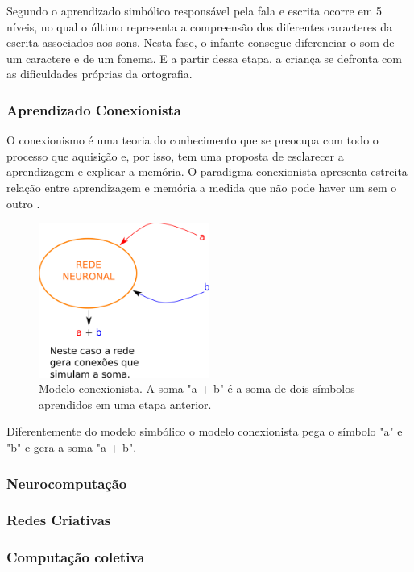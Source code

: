 Segundo \citet{Ferreiro1999} o aprendizado simbólico responsável pela fala e escrita ocorre em 5 níveis, no qual o último representa a compreensão dos diferentes caracteres da escrita associados aos sons. Nesta fase, o infante consegue diferenciar o som de um caractere e de um fonema. E a partir dessa etapa, a criança se defronta com as dificuldades próprias da ortografia.

\subsubsection{Aprendizado Conexionista }

O conexionismo é uma teoria do conhecimento que se preocupa com todo o processo que aquisição e, por isso, tem uma proposta de esclarecer a aprendizagem e explicar a memória. O paradigma conexionista apresenta estreita relação entre aprendizagem e memória a medida que não pode haver um sem o outro \citep{Rossa2009}. 

\begin{figure}[H]
\centering
\includegraphics[width=0.5\textwidth]{Imagens/Fig1.png}
\caption{Modelo conexionista. A soma "a + b" é a soma de dois símbolos aprendidos em uma etapa anterior.}
\end{figure}

Diferentemente do modelo simbólico o modelo conexionista pega o símbolo "a" e "b" e gera a soma "a + b".

\subsubsection{Neurocomputação}

\subsubsection{Redes Criativas }

\subsubsection{Computação coletiva}


